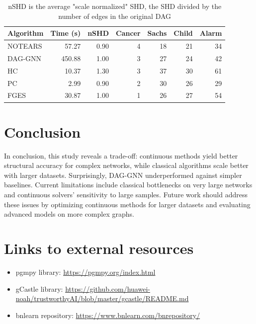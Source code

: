 \documentclass[letterpaper]{article}
\begin{document}
\begin{table}[t]
\centering
\scriptsize
\setlength{\tabcolsep}{5pt}
\caption{nSHD is the average "scale normalized" SHD, the SHD divided by the number of edges in the original DAG}
\label{tab:results}
\vspace{4pt}
\begin{tabular}{lrrrrrr}
\toprule
Algorithm & Time (s) & nSHD & Cancer & Sachs & Child & Alarm \\
\midrule
NOTEARS &  57.27 & 0.90 &  4 & 18 & 21 & 34 \\
DAG-GNN & 450.88 & 1.00 &  3 & 27 & 24 & 42 \\
HC      &  10.37 & 1.30 &  3 & 37 & 30 & 61 \\
PC      &   2.99 & 0.90 &  2 & 30 & 26 & 29 \\
FGES    &  30.87 & 1.00 &  1 & 26 & 27 & 54 \\
\bottomrule
\end{tabular}
\end{table}


\section{Conclusion}
In conclusion, this study reveals a trade-off:
continuous methods yield better structural accuracy for complex networks, while classical
algorithms scale better with larger datasets. Surprisingly, DAG-GNN 
underperformed against simpler baselines. Current limitations
include classical bottlenecks on very large networks and continuous solvers' sensitivity to large
samples. Future work should address these issues by optimizing continuous methods for larger
datasets and evaluating advanced models on more complex graphs. 


\section{Links to external resources}
\begin{itemize}
    \item pgmpy library: \url{https://pgmpy.org/index.html}
    \item gCastle library: \url{https://github.com/huawei-noah/trustworthyAI/blob/master/gcastle/README.md}
    \item bnlearn repository: \url{https://www.bnlearn.com/bnrepository/}
\end{itemize}



\end{document}
